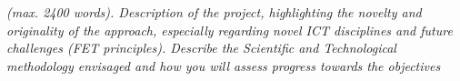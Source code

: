 % 
%
%
%

\emph{(max. 2400 words). Description of the project, highlighting the novelty
  and originality of the approach, especially regarding novel ICT disciplines
  and future challenges (FET principles). Describe the Scientific and
  Technological methodology envisaged and how you will assess progress towards
  the objectives} 






% 
